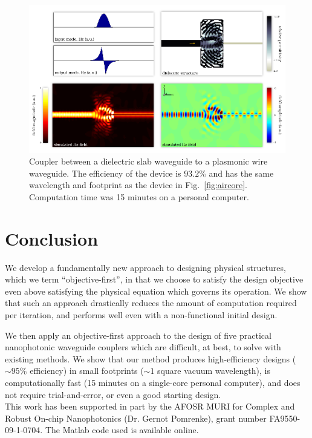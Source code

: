 \documentclass[letterpaper,10pt]{article}
\begin{document}
\begin{figure}[htbp]
    \centering
    \includegraphics[width=\textwidth]{5}
    \caption{Coupler between a dielectric slab waveguide to 
            a plasmonic wire waveguide.
        The efficiency of the device is $93.2\%$ and 
            has the same wavelength and footprint as the device in
            Fig.~\ref{fig:aircore}.
        Computation time was 15 minutes on a personal computer.
        }
        \label{fig:wire}
\end{figure}

\section{Conclusion}
We develop a fundamentally new approach to designing physical structures,
    which we term ``objective-first'', 
    in that we choose to satisfy the design objective 
    even above satisfying the physical equation which governs its operation.
We show that such an approach drastically reduces the
    amount of computation required per iteration, and 
    performs well even with a non-functional initial design.

We then apply an objective-first approach to the design of 
    five practical nanophotonic waveguide couplers which are difficult, 
    at best, to solve with existing methods. 
We show that our method produces
    high-efficiency designs ($\sim 95\%$ efficiency) 
    in small footprints ($\sim 1$ square vacuum wavelength),
    is computationally fast (15 minutes on a single-core personal computer), and
    does not require trial-and-error, or even 
    a good starting design.\\


This work has been supported in part by the 
    AFOSR MURI for Complex and Robust On-chip Nanophotonics 
    (Dr. Gernot Pomrenke), grant number FA9550-09-1-0704.
The Matlab code used is available online\cite{code}.
\end{document}
